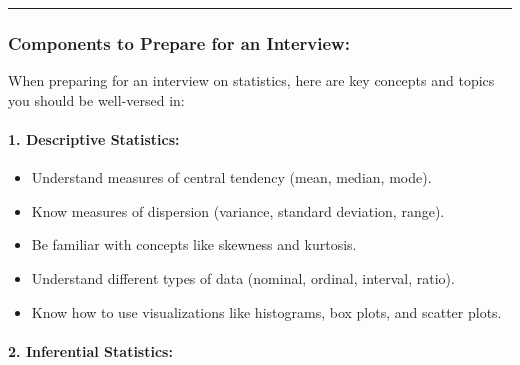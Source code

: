 \documentclass[12pt]{book}
\providecommand{\tightlist}{%
  \setlength{\itemsep}{0pt}\setlength{\parskip}{0pt}}
\begin{document}
\begin{center}\rule{0.5\linewidth}{0.5pt}\end{center}

\subsubsection{\texorpdfstring{\textbf{Components to Prepare for an
Interview:}}{Components to Prepare for an Interview:}}\label{components-to-prepare-for-an-interview}

When preparing for an interview on statistics, here are key concepts and
topics you should be well-versed in:

\paragraph{\texorpdfstring{\textbf{1. Descriptive
Statistics:}}{1. Descriptive Statistics:}}\label{descriptive-statistics-1}

\begin{itemize}
\tightlist
\item
  Understand measures of central tendency (mean, median, mode).
\item
  Know measures of dispersion (variance, standard deviation, range).
\item
  Be familiar with concepts like skewness and kurtosis.
\item
  Understand different types of data (nominal, ordinal, interval,
  ratio).
\item
  Know how to use visualizations like histograms, box plots, and scatter
  plots.
\end{itemize}

\paragraph{\texorpdfstring{\textbf{2. Inferential
Statistics:}}{2. Inferential Statistics:}}\label{inferential-statistics-1}
\end{document}
